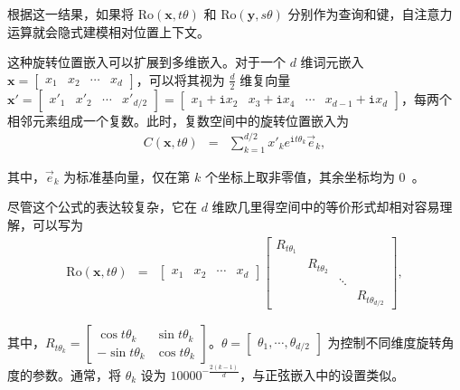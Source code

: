 \noindent 根据这一结果，如果将 $\mathrm{Ro}(\mathbf{x},t\theta)$ 和 $\mathrm{Ro}(\mathbf{y},s\theta)$ 分别作为查询和键，自注意力运算就会隐式建模相对位置上下文。

这种旋转位置嵌入可以扩展到多维嵌入。对于一个 $d$ 维词元嵌入 $\mathbf{x} = \begin{bmatrix} x_1 & x_2 & \cdots & x_d \end{bmatrix}$，可以将其视为 $\frac{d}{2}$ 维复向量 $\mathbf{x}' = \begin{bmatrix} x'_1 & x'_2 & \cdots & x'_{d/2} \end{bmatrix} = \begin{bmatrix} x_1 + \mathtt{i} x_2 & x_3 + \mathtt{i} x_4 & \cdots & x_{d-1} + \mathtt{i} x_d \end{bmatrix}$，每两个相邻元素组成一个复数。此时，复数空间中的旋转位置嵌入为
\begin{eqnarray}
C(\mathbf{x},t\theta) & = & \sum_{k=1}^{d/2} x'_k e^{\mathtt{i} t\theta_k} \vec{e}_k,
\end{eqnarray}

\noindent 其中，$\vec{e}_k$ 为标准基向量，仅在第 $k$ 个坐标上取非零值，其余坐标均为 0~\cite{biderman-etal:2021rotary}。

尽管这个公式的表达较复杂，它在 $d$ 维欧几里得空间中的等价形式却相对容易理解，可以写为
\begin{eqnarray}
\mathrm{Ro}(\mathbf{x},t\theta) & = & \begin{bmatrix} x_1 & x_2 & \cdots & x_d \end{bmatrix}
                                      \begin{bmatrix} R_{t\theta_1} & & & \\ & R_{t\theta_2} & & \\ & & \ddots & \\ & & & R_{t\theta_{d/2}} \end{bmatrix} \label{eq:rope-base},
\end{eqnarray}

\noindent 其中，$R_{t \theta_k} = \begin{bmatrix} \cos t \theta_k & \sin t \theta_k \\ -\sin t \theta_k & \cos t \theta_k \end{bmatrix}$。$\theta = \begin{bmatrix} \theta_1, \cdots, \theta_{d/2}\end{bmatrix}$ 为控制不同维度旋转角度的参数。通常，将 $\theta_k$ 设为 $10000^{-\frac{2(k-1)}{d}}$，与正弦嵌入中的设置类似。


